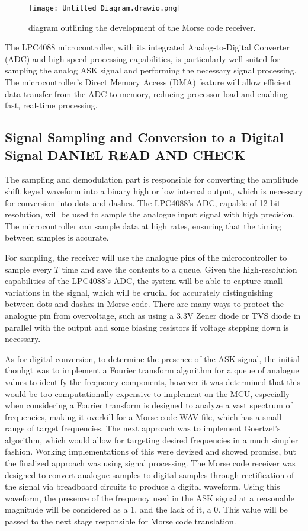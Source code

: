 \documentclass{cce2014-design}
\begin{document}
\begin{figure}[h]
    \centering
    \texttt{[image: Untitled\_Diagram.drawio.png]}
    \caption{diagram outlining the development of the Morse code receiver.}
    \label{fig:stage_diagram}
\end{figure}

The LPC4088 microcontroller, with its integrated Analog-to-Digital Converter (ADC) and high-speed processing capabilities, is particularly well-suited for sampling the analog ASK signal and performing the necessary signal processing. The microcontroller's Direct Memory Access (DMA) feature will allow efficient data transfer from the ADC to memory, reducing processor load and enabling fast, real-time processing.

\subsection{Signal Sampling and Conversion to a Digital Signal DANIEL READ AND CHECK}
The sampling and demodulation part is responsible for converting the amplitude shift keyed waveform into a binary high or low internal output, which is necessary for conversion into dots and dashes. The LPC4088’s ADC, capable of 12-bit resolution, will be used to sample the analogue input signal with high precision. The microcontroller can sample data at high rates, ensuring that the timing between samples is accurate.

For sampling, the receiver will use the analogue pins of the microcontroller to sample every \( T \) time and save the contents to a queue. Given the high-resolution capabilities of the LPC4088’s ADC, the system will be able to capture small variations in the signal, which will be crucial for accurately distinguishing between dots and dashes in Morse code. There are many ways to protect the analogue pin from overvoltage, such as using a 3.3V Zener diode or TVS diode in parallel with the output and some biasing resistors if voltage stepping down is necessary.

As for digital conversion, to determine the presence of the ASK signal, the initial thouhgt was to implement a Fourier transform algorithm for a queue of analogue values to identify the frequency components, however it was determined that this would be too computationally expensive to implement on the MCU, especially when considering a Fourier transform is designed to analyze a vast spectrum of frequencies, making it overkill for a Morse code WAV file, which has a small range of target frequencies. The next approach was to implement Goertzel's algorithm, which would allow for targeting desired frequencies in a much simpler fashion. Working implementations of this were devized and showed promise, but the finalized approach was using signal processing. The Morse code receiver was designed to convert analogue samples to digital samples through rectification of the signal via breadboard circuits to produce a digital waveform. Using this waveform, the presence of the frequency used in the ASK signal at a reasonable magnitude will be considered as a 1, and the lack of it, a 0. This value will be passed to the next stage responsible for Morse code translation.
\end{document}
